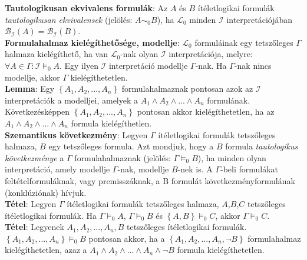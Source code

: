 \documentclass[margin=0px]{article}
\begin{document}
\noindent \textbf{Tautologikusan ekvivalens formulák}: Az $A$ és $B$ ítéletlogikai formulák \textit{tautologikusan ekvivalensek} (jelölés: $A \sim _{0} B$), ha $\mathcal{L}_{0}$ minden $\mathcal{I}$ interpretációjában $\mathcal{B}_{\mathcal{I}}(A)=\mathcal{B}_{\mathcal{I}}(B)$.\\

\noindent \textbf{Formulahalmaz kielégíthetősége, modellje}: $\mathcal{L}_{0}$ formuláinak egy tetszőleges $\Gamma$ halmaza
kielégíthető, ha van $\mathcal{L}_{0}$-nak olyan $\mathcal{I}$ interpretációja, melyre: $\forall A \in \Gamma: \mathcal{I} \models_{0} A$.
Egy ilyen $\mathcal{I}$ interpretáció modellje $\Gamma$-nak. Ha $\Gamma$-nak nincs modellje, akkor $\Gamma$ kielégíthetetlen.\\

\noindent \textbf{Lemma}: Egy $\left\{A_{1},A_{2},...,A_{n}\right\}$ formulahalmaznak pontosan azok az $\mathcal{I}$ interpretációk
a modelljei, amelyek a $A_{1} \wedge A_{2} \wedge ... \wedge A_{n}$ formulának. Következésképpen $\left\{A_{1},A_{2},...,A_{n}\right\}$
pontosan akkor kielégíthetetlen, ha az $A_{1} \wedge A_{2} \wedge ... \wedge A_{n}$ formula kielégíthetlen.\\

\noindent \textbf{Szemantikus következmény}: Legyen $\Gamma$ ítéletlogikai formulák tetszőleges halmaza, $B$ egy tetszőleges formula.
Azt mondjuk, hogy a $B$ formula \textit{tautologikus következménye} a $\Gamma$ formulahalmaznak (jelölés: $\Gamma \models_{0} B$), ha minden olyan interpretáció, amely modellje $\Gamma$-nak, modellje $B$-nek is. A $\Gamma$-beli formulákat feltételformuláknak, vagy premisszáknak,
a B formulát következményformulának (konklúziónak) hívjuk.\\

\noindent \textbf{Tétel}: Legyen $\Gamma$ ítéletlogikai formulák tetszőleges halmaza, $A$,$B$,$C$ tetszőleges ítéletlogikai formulák.
Ha $\Gamma \models_{0} A$, $\Gamma \models_{0} B$ és $\left\{A,B\right\} \models_{0} C$, akkor $\Gamma \models_{0} C$.\\

\noindent \textbf{Tétel}: Legyenek $A_{1},A_{2},...,A_{n}, B$ tetszőleges ítéletlogikai formulák.
$\left\{A_{1},A_{2},...,A_{n}\right\} \models_{0} B$ pontosan akkor, ha a $\left\{A_{1},A_{2},...,A_{n}, \neg B\right\}$
formulahalmaz kielégíthetetlen, azaz a $A_{1} \wedge A_{2} \wedge ... \wedge A_{n} \wedge \neg B$ formula kielégíthetetlen.\\
\end{document}
